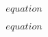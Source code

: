 \documentclass{article}
\begin{document}
\begin{equation}
  equation
\end{equation}

\begin{equation}
  equation
\end{equation}
\end{document}
